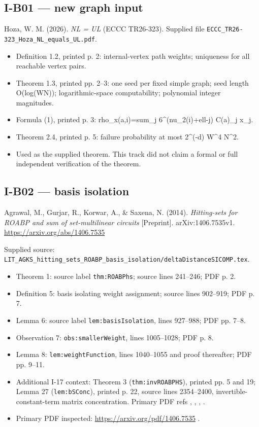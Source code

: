\documentclass[11pt,a4paper]{article}
\providecommand{\tightlist}{\setlength{\itemsep}{0pt}\setlength{\parskip}{0pt}}
\theoremstyle{definition}\newtheorem{definition}{Definition}
\begin{document}
\subsection{I-B01 --- new graph input}\label{i-b01--new-graph-input}

Hoza, W. M. (2026). \emph{NL = UL} (ECCC TR26-323). Supplied file
\nolinkurl{ECCC_TR26-323_Hoza_NL_equals_UL.pdf}.

\begin{itemize}
\tightlist
\item
  Definition 1.2, printed p. 2: internal-vertex path weights; uniqueness
  for all reachable vertex pairs.
\item
  Theorem 1.3, printed pp. 2--3: one seed per fixed simple graph; seed
  length O(log(WN)); logarithmic-space computability; polynomial integer
  magnitudes.
\item
  Formula (1), printed p. 3: rho\_x(a,i)=sum\_j 6\^{}(nu\_2(i)+ell-j)
  C(a)\_j x\_j.
\item
  Theorem 2.4, printed p. 5: failure probability at most 2\^{}(-d)
  W\^{}4 N\^{}2.
\item
  Used as the supplied theorem. This track did not claim a formal or
  full independent verification of the theorem.
\end{itemize}

\subsection{I-B02 --- basis isolation}\label{i-b02--basis-isolation}

Agrawal, M., Gurjar, R., Korwar, A., \& Saxena, N. (2014).
\emph{Hitting-sets for ROABP and sum of set-multilinear circuits}
{[}Preprint{]}. arXiv:1406.7535v1. \url{https://arxiv.org/abs/1406.7535}

Supplied source:
\nolinkurl{LIT_AGKS_hitting_sets_ROABP_basis_isolation/deltaDistanceSICOMP.tex}.

\begin{itemize}
\tightlist
\item
  Theorem 1: source label \nolinkurl{thm:ROABPhs}; source lines 241--246;
  PDF p. 2.
\item
  Definition 5: basis isolating weight assignment; source lines
  902--919; PDF p. 7.
\item
  Lemma 6: source label \nolinkurl{lem:basisIsolation}, lines 927--988; PDF
  pp. 7--8.
\item
  Observation 7: \nolinkurl{obs:smallerWeight}, lines 1005--1028; PDF p. 8.
\item
  Lemma 8: \nolinkurl{lem:weightFunction}, lines 1040--1055 and proof
  thereafter; PDF pp. 9--11.
\item
  Additional I-17 context: Theorem 3 (\nolinkurl{thm:invROABPHS}), printed
  pp. 5 and 19; Lemma 27 (\nolinkurl{lem:bSConc}), printed p. 22, source
  lines 2354--2400, invertible-constant-term matrix concentration.
  Primary PDF refs , , , .
\item
  Primary PDF inspected: \url{https://arxiv.org/pdf/1406.7535} .
\end{itemize}
\end{document}
